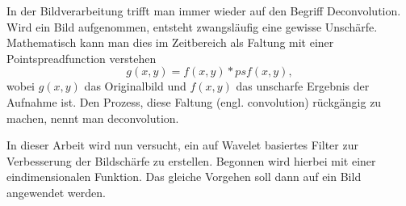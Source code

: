 In der Bildverarbeitung trifft man immer wieder auf den Begriff Deconvolution.
Wird ein Bild aufgenommen, entsteht zwangsläufig eine gewisse Unschärfe.
Mathematisch kann man dies im Zeitbereich als Faltung mit einer Pointspreadfunction \cite{buch:image_processing} verstehen
$$g(x,y) = f(x,y)*psf(x,y),$$
wobei $g(x,y)$ das Originalbild und $f(x,y)$ das unscharfe Ergebnis der Aufnahme ist.
Den Prozess, diese Faltung (engl. convolution) rückgängig zu machen, nennt man deconvolution.

In dieser Arbeit wird nun versucht, ein auf Wavelet basiertes Filter zur Verbesserung der Bildschärfe zu erstellen. Begonnen wird hierbei mit einer eindimensionalen Funktion. Das gleiche Vorgehen soll dann auf ein Bild angewendet werden.